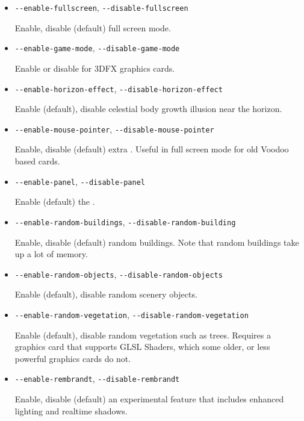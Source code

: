 \begin{itemize}
{\begin{itemize}
  Enable or disable more realistic runway and approach lights.

  \item{\texttt{-$ $-enable-fullscreen}, \texttt{-$ $-disable-fullscreen}}

  Enable, disable (default) full screen mode.

  \item{\texttt{-$ $-enable-game-mode}, \texttt{-$ $-disable-game-mode}}

  Enable or disable  for 3DFX graphics cards.

  \item{\texttt{-$ $-enable-horizon-effect}, \texttt{-$ $-disable-horizon-effect}}

  Enable (default), disable celestial body growth illusion near the horizon.

  \item{\texttt{-$ $-enable-mouse-pointer}, \texttt{-$ $-disable-mouse-pointer}}

  Enable, disable (default) extra . Useful in full screen mode for old Voodoo based cards.

  \item{\texttt{-$ $-enable-panel}, \texttt{-$ $-disable-panel}}

  Enable (default) the .

  \item{\texttt{-$ $-enable-random-buildings}, \texttt{-$ $-disable-random-building}}

  Enable, disable (default) random buildings. Note that random buildings take up a lot of memory.

  \item{\texttt{-$ $-enable-random-objects}, \texttt{-$ $-disable-random-objects}}

  Enable (default), disable random scenery objects.

  \item{\texttt{-$ $-enable-random-vegetation}, \texttt{-$ $-disable-random-vegetation}}

  Enable (default), disable random vegetation such as trees. Requires a graphics card that
  supports GLSL Shaders, which some older, or less powerful graphics cards do not.

  \item{\texttt{-$ $-enable-rembrandt}, \texttt{-$ $-disable-rembrandt}}

  Enable, disable (default) an experimental feature that includes
   enhanced lighting and realtime shadows.


\end{itemize}}
\end{itemize}
